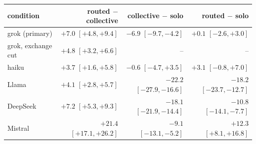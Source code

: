 {\footnotesize
\begin{tabular}{@{}lrrr@{}}
\toprule
condition & routed $-$ collective & collective $-$ solo & routed $-$ solo \\
\midrule
grok (primary) & $+7.0$ $[+4.8, +9.4]$ & $-6.9$ $[-9.7, -4.2]$ & $+0.1$ $[-2.6, +3.0]$ \\
grok, exchange cut & $+4.8$ $[+3.2, +6.6]$ & -- & -- \\
haiku & $+3.7$ $[+1.6, +5.8]$ & $-0.6$ $[-4.7, +3.5]$ & $+3.1$ $[-0.8, +7.0]$ \\
Llama & $+4.1$ $[+2.8, +5.7]$ & $-22.2$ $[-27.9, -16.6]$ & $-18.2$ $[-23.7, -12.7]$ \\
DeepSeek & $+7.2$ $[+5.3, +9.3]$ & $-18.1$ $[-21.9, -14.4]$ & $-10.8$ $[-14.1, -7.7]$ \\
Mistral & $+21.4$ $[+17.1, +26.2]$ & $-9.1$ $[-13.1, -5.2]$ & $+12.3$ $[+8.1, +16.8]$ \\
\bottomrule
\end{tabular}}
